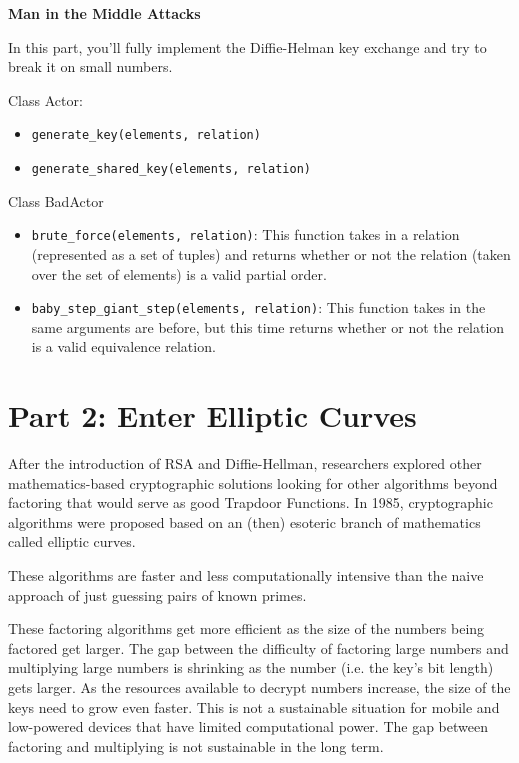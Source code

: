 \documentclass{article}
\begin{document}
\begin{center}
    \textbf{Man in the Middle Attacks}
\end{center}

\begin{tcolorbox}
    In this part, you'll fully implement the Diffie-Helman key exchange and try to break it on small numbers.

    Class Actor:
    \begin{itemize}
        \item \lstinline{generate_key(elements, relation)}
        \item \lstinline{generate_shared_key(elements, relation)}
    \end{itemize}

    Class BadActor
    \begin{itemize}
            \item \lstinline{brute_force(elements, relation)}: This function takes in a relation (represented as a set of tuples) and returns whether or not the relation (taken over the set of elements) is a valid partial order.
            \item \lstinline{baby_step_giant_step(elements, relation)}: This function takes in the same arguments are before, but this time returns whether or not the relation is a valid equivalence relation.
        \end{itemize}
\end{tcolorbox}


\section*{Part 2: Enter Elliptic Curves}

After the introduction of RSA and Diffie-Hellman, researchers explored other mathematics-based cryptographic solutions looking for other algorithms beyond factoring that would serve as good Trapdoor Functions. In 1985, cryptographic algorithms were proposed based on an (then) esoteric branch of mathematics called elliptic curves.

These algorithms are faster and less computationally intensive than the naive approach of just guessing pairs of known primes.

These factoring algorithms get more efficient as the size of the numbers being factored get larger. The gap between the difficulty of factoring large numbers and multiplying large numbers is shrinking as the number (i.e. the key's bit length) gets larger. As the resources available to decrypt numbers increase, the size of the keys need to grow even faster. This is not a sustainable situation for mobile and low-powered devices that have limited computational power. The gap between factoring and multiplying is not sustainable in the long term.
\end{document}
